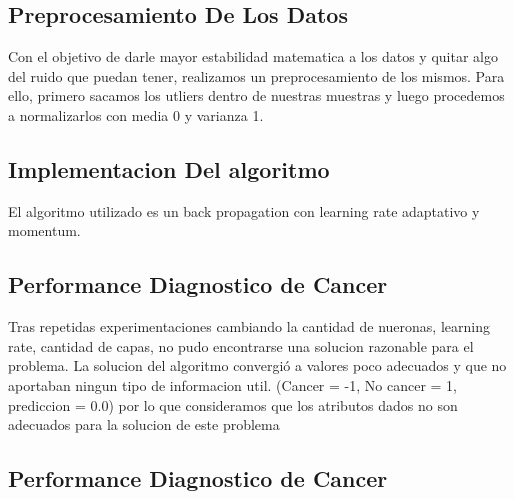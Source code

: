 \subsection{Preprocesamiento De Los Datos} 
Con el objetivo de darle mayor estabilidad matematica a los datos y quitar algo del ruido que puedan tener, realizamos un preprocesamiento de los mismos. Para ello, primero sacamos los utliers dentro de nuestras muestras y luego procedemos a normalizarlos con media 0 y varianza 1.

\subsection{Implementacion Del algoritmo} 

El algoritmo utilizado es un back propagation con learning rate adaptativo y momentum.

\subsection{Performance Diagnostico de Cancer} 

Tras repetidas experimentaciones cambiando la cantidad de nueronas, learning rate, cantidad de capas, no pudo encontrarse una solucion razonable para el problema. La solucion del algoritmo convergió a valores poco adecuados y que no aportaban ningun tipo de informacion util. (Cancer = -1, No cancer = 1, prediccion = 0.0) por lo que consideramos que los atributos dados no son adecuados para la solucion de este problema

\subsection{Performance Diagnostico de Cancer} 

